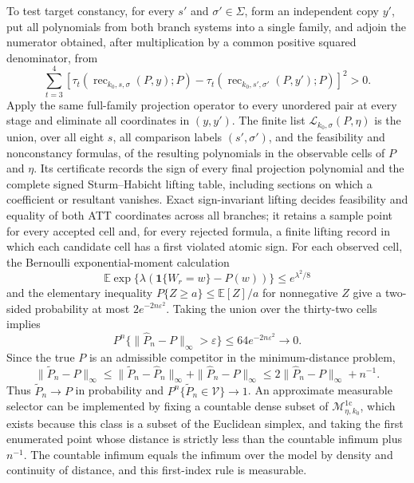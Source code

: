 To test target constancy, for every \(s'\) and \(\sigma'\in\Sigma\), form an independent copy \(y'\), put all polynomials from both branch systems into a single family, and adjoin the numerator obtained, after multiplication by a common positive squared denominator, from
\[
 \sum_{t=3}^{4}\left[
 \tau_t\!\left(\operatorname{rec}_{k_0,s,\sigma}(P,y);P\right)
 -\tau_t\!\left(\operatorname{rec}_{k_0,s',\sigma'}(P,y');P\right)
 \right]^2>0.
\]
Apply the same full-family projection operator to every unordered pair at every stage and eliminate all coordinates in \((y,y')\).  The finite list \(\mathscr L_{k_0,\sigma}(P,\eta)\) is the union, over all eight \(s\), all comparison labels \((s',\sigma')\), and the feasibility and nonconstancy formulas, of the resulting polynomials in the observable cells of \(P\) and \(\eta\).  Its certificate records the sign of every final projection polynomial and the complete signed Sturm--Habicht lifting table, including sections on which a coefficient or resultant vanishes.  Exact sign-invariant lifting decides feasibility and equality of both ATT coordinates across all branches; it retains a sample point for every accepted cell and, for every rejected formula, a finite lifting record in which each candidate cell has a first violated atomic sign.
For each observed cell, the Bernoulli exponential-moment calculation
\[
 \mathbb E\exp\{\lambda(\mathbf 1\{W_r=w\}-P(w))\}\leq e^{\lambda^2/8}
\]
and the elementary inequality \(P\{Z\geq a\}\leq\mathbb E[Z]/a\) for nonnegative \(Z\) give a two-sided probability at most \(2e^{-2n\varepsilon^2}\).  Taking the union over the thirty-two cells implies
\[
 P^n\{\|\widehat P_n-P\|_\infty>\varepsilon\}
 \leq64e^{-2n\varepsilon^2}\longrightarrow0.
 \tag{20}
\]
Since the true \(P\) is an admissible competitor in the minimum-distance problem,
\[
 \|\widetilde P_n-P\|_\infty
 \leq\|\widetilde P_n-\widehat P_n\|_\infty+\|\widehat P_n-P\|_\infty
 \leq2\|\widehat P_n-P\|_\infty+n^{-1}.
 \tag{21}
\]
Thus \(\widetilde P_n\to P\) in probability and \(P^n\{\widetilde P_n\in\mathcal V\}\to1\).  An approximate measurable selector can be implemented by fixing a countable dense subset of \(\mathcal M_{\eta,k_0}^{1\mathrm c}\), which exists because this class is a subset of the Euclidean simplex, and taking the first enumerated point whose distance is strictly less than the countable infimum plus \(n^{-1}\).  The countable infimum equals the infimum over the model by density and continuity of distance, and this first-index rule is measurable.

